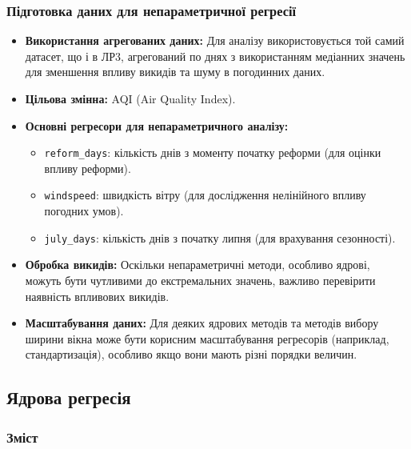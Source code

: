 ﻿\documentclass{beamer}
\begin{document}
\begin{frame}
  \frametitle{Підготовка даних для непараметричної регресії}
  \begin{itemize}
    \item \textbf{Використання агрегованих даних:} Для аналізу використовується той самий датасет, що і в ЛР3, агрегований по днях з використанням медіанних значень для зменшення впливу викидів та шуму в погодинних даних.
    \item \textbf{Цільова змінна:} AQI (Air Quality Index).
    \item \textbf{Основні регресори для непараметричного аналізу:}
        \begin{itemize}
            \item \texttt{reform\_days}: кількість днів з моменту початку реформи (для оцінки впливу реформи).
            \item \texttt{windspeed}: швидкість вітру (для дослідження нелінійного впливу погодних умов).
            \item \texttt{july\_days}: кількість днів з початку липня (для врахування сезонності).
        \end{itemize}
    \item \textbf{Обробка викидів:} Оскільки непараметричні методи, особливо ядрові, можуть бути чутливими до екстремальних значень, важливо перевірити наявність впливових викидів. 
    \item \textbf{Масштабування даних:} Для деяких ядрових методів та методів вибору ширини вікна може бути корисним масштабування регресорів (наприклад, стандартизація), особливо якщо вони мають різні порядки величин.
  \end{itemize}
\end{frame}

\begin{frame}
  \section{Ядрова регресія}

  \frametitle{Зміст}
  \tableofcontents[currentsection]
\end{frame}
\end{document}
